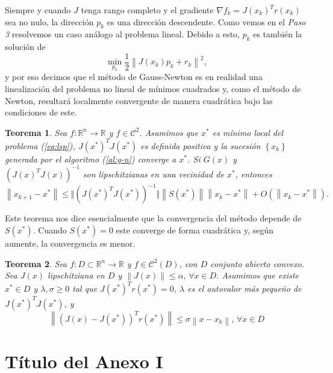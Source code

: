 \documentclass[11pt,a4paper]{book}
\newtheorem{theorem}{Teorema}[chapter]
\theoremstyle{definition}
\theoremstyle{remark}
\newcommand{\norm}[1]{\left\lVert#1\right\rVert}
\newcommand{\sucesionxk}{\left\{x_k\right\}}
\begin{document}
Siempre y cuando $J$ tenga rango completo y el gradiente $\nabla f_k = J(x_k)^Tr(x_k)$ sea no nulo, la dirección $p_k$ es una dirección descendente.
Como vemos en el \textit{Paso 3} resolvemos un caso análogo al problema lineal. Debido a esto, $p_k$ es también la solución de
\begin{equation}
	\min_{p_k} \frac{1}{2} \norm{J(x_k)p_k + r_k}^2,
\end{equation}
y por eso decimos que el método de Gauss-Newton es en realidad una linealización del problema no lineal de mínimos cuadrados y, como el método de Newton, resultará localmente convergente de manera cuadrática bajo las condiciones de este.

\begin{theorem}
	Sea $f: \mathbb{R}^n \rightarrow \mathbb{R}$ y $f \in \mathcal{C}^2$. Asumimos que $x^*$ es mínimo local del problema (\ref{eq:lsp}), $J(x^*)^TJ(x^*)$ es definida positiva y la sucesión $\sucesionxk$ generada por el algoritmo (\ref{al:g-n}) converge a $x^*$. Si $G(x)$ y $(J(x)^TJ(x))^{-1}$ son lipschitzianas en una vecinidad de $x^*$, entonces
\begin{equation}
	\norm{x_{k+1}-x^*} \leq \Vert (J(x^*)^TJ(x^*))^{-1} \Vert \norm{S(x^*)} \norm{x_k-x^*}
	+ O(\norm{x_k-x^*}).
\end{equation}
\end{theorem}

Este teorema nos dice esencialmente que la convergencia del método depende de $S(x^*)$. Cuando $S(x^*)=0$ este converge de forma cuadrática y, según aumente, la convergencia es menor.

\begin{theorem}
	Sea $f:D \subset \mathbb{R}^n \rightarrow \mathbb{R}$ y $f \in \mathcal{C}^2(D)$, con $D$ conjunto abierto convexo. Sea $J(x)$ lipschitziana en $D$ y $\norm{J(x)} \leq \alpha, \, \forall x \in D$. Asumimos que existe $x^* \in D$ y $\lambda, \sigma \geq 0$ tal que $J(x^*)^Tr(x^*)=0$,
$\lambda$ es el autovalor más pequeño de $J(x^*)^TJ(x^*)$, y
	\begin{equation}
		\norm{(J(x)-J(x^*))^Tr(x^*)} \leq \sigma \norm{x-x_k},\,\forall x \in D
	\end{equation}
\end{theorem}

\appendix
\renewcommand{\thechapter}{\Roman{chapter}}
\chapter{Título del Anexo I}
\end{document}
